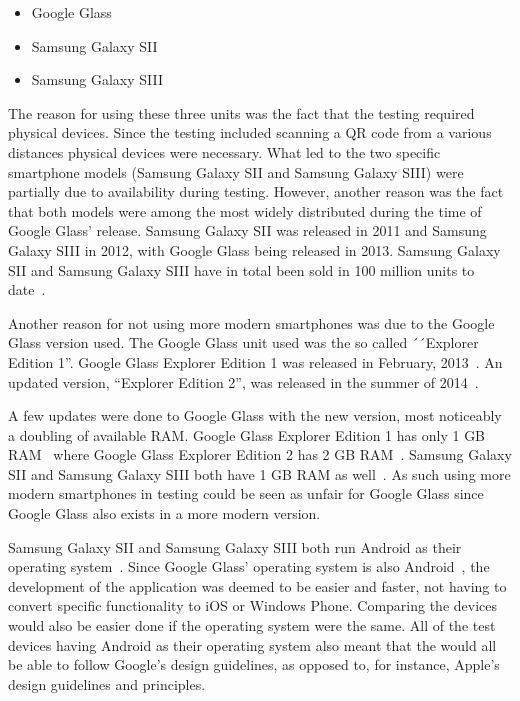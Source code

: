 \begin{itemize}
	\item Google Glass
	\item Samsung Galaxy SII
	\item Samsung Galaxy SIII
\end{itemize}

The reason for using these three units was the fact that the testing required physical devices. Since the testing included scanning a QR code from a various distances physical devices were necessary. What led to the two specific smartphone models (Samsung Galaxy SII and Samsung Galaxy SIII) were partially due to availability during testing. However, another reason was the fact that both models were among the most widely distributed during the time of Google Glass' release. Samsung Galaxy SII was released in 2011 and Samsung Galaxy SIII in 2012, with Google Glass being released in 2013. Samsung Galaxy SII and Samsung Galaxy SIII have in total been sold in 100 million units to date~\cite{samsungGalaxyS2Sales, samsungGalaxyS3Sales}.

Another reason for not using more modern smartphones was due to the Google Glass version used. The Google Glass unit used was the so called ´´Explorer Edition 1''. Google Glass Explorer Edition 1 was released in February, 2013~\cite{historyOfGlass}. An updated version, ``Explorer Edition 2'', was released in the summer of 2014~\cite{googleGlassEdition2RAM}. 

A few updates were done to Google Glass with the new version, most noticeably a doubling of available RAM. Google Glass Explorer Edition 1 has only 1 GB RAM~\cite{googleGlassEdition1RAM} where Google Glass Explorer Edition 2 has 2 GB RAM~\cite{googleGlassEdition2RAM}. Samsung Galaxy SII and Samsung Galaxy SIII both have 1 GB RAM as well~\cite{samsungGalaxyS2Wiki, samsungGalaxyS3Wiki}. As such using more modern smartphones in testing could be seen as unfair for Google Glass since Google Glass also exists in a more modern version.

Samsung Galaxy SII and Samsung Galaxy SIII both run Android as their operating system~\cite{samsungGalaxyS2Wiki, samsungGalaxyS3Wiki}. Since Google Glass' operating system is also Android~\cite{googleGlassWiki}, the development of the application was deemed to be easier and faster, not having to convert specific functionality to iOS or Windows Phone. Comparing the devices would also be easier done if the operating system were the same. All of the test devices having Android as their operating system also meant that the would all be able to follow Google's design guidelines, as opposed to, for instance, Apple's design guidelines and principles\cite{iosDesignGuidelines}.

